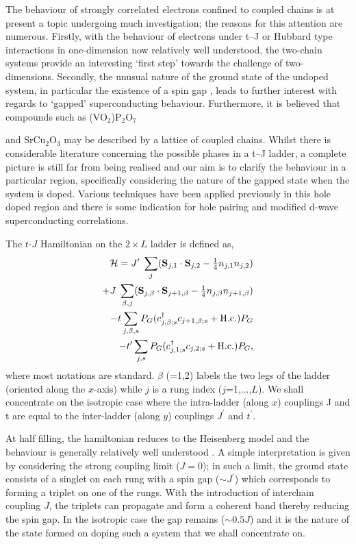 The behaviour of strongly correlated electrons confined to
coupled chains is at present a topic undergoing much investigation; the
reasons for this attention are numerous.
Firstly, with the behaviour of electrons under t--J or Hubbard type
interactions in one-dimension now  relatively well
understood, the two-chain systems provide an interesting `first step' towards
the challenge of
two-dimensions.
Secondly, the unusual nature of the ground state  of the  undoped system,
in particular the existence of a spin gap \cite{heisladder},
leads to further interest with regards to   `gapped' superconducting
behaviour.
Furthermore, it is believed that  compounds such as (VO$_2$)P$_2$O$_7$
\cite{compounds1}{
and SrCu$_2$O$_3$ \cite{compounds2} may be described
by a lattice of  coupled chains.
Whilst there is considerable literature concerning
the possible  phases in a  t--J ladder, a complete picture is still far from
being realised and our aim is to clarify
the behaviour in a particular region, specifically considering
the nature of the gapped state
when the system is doped.
 Various techniques have been
applied previously  in this hole doped region \cite{scmethods}
and there is some indication
for hole pairing and modified d-wave superconducting correlations.

The $t$-$J$ Hamiltonian on the $2\times L$ ladder is defined as,
\begin{eqnarray}
   {\cal H}=
   J^\prime \; \sum_{j}
   ({\bf S}_{j,1} \cdot {\bf S}_{j,2}
   - \textstyle{1\over4} n_{j,1} n_{j,2} ) \cr
   +J\;\sum_{\beta,j}
   ({\bf S}_{j,\beta} \cdot {\bf S}_{j+1,\beta}
   - \textstyle{1\over4} n_{j,\beta} n_{j+1,\beta} ) \cr
      - {t} \sum_{j,\beta ,s}
   P_G({c}^{\dagger}_{j,\beta;s}{c}_{j+1,\beta;s} + {\rm H.c.})P_G  \cr
      - {t^\prime} \sum_{j,s}
   P_G({c}^{\dagger}_{j,1;s}{c}_{j,2;s} + {\rm H.c.})P_G ,
\label{hamiltonian}
\end{eqnarray}
\noindent
where most notations are standard. $\beta$ (=1,2)
labels the two legs of the ladder (oriented along the
$x$-axis) while $j$ is a rung index ($j$=1,...,$L$).
We shall concentrate on the isotropic case where
the intra-ladder
 (along $x$) couplings   J and t  are equal to
the inter-ladder   (along $y$) couplings   $J^\prime$ and $t^\prime$.

At half filling, the hamiltonian reduces to the Heisenberg model and  the
behaviour
is generally
relatively well
understood \cite{heisladder}.
A  simple interpretation  is given by considering the
strong coupling limit ($J=0$);
in such a limit, the ground state consists of
a  singlet  on each rung with a spin gap  ($\sim J^\prime$) which
corresponds to forming a triplet on one of the rungs. With the introduction of
interchain coupling $J$, the triplets  can propagate and form a coherent band
thereby reducing the spin gap. In the isotropic  case
 the gap remains ($\sim 0.5J$) and it is the nature of the state formed
 on doping such a system that we shall concentrate on.

}
